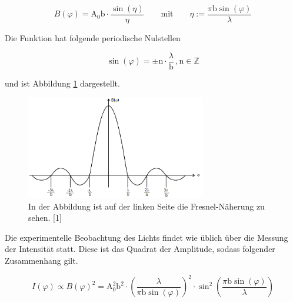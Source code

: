 \documentclass[titlepage = firstcover]{scrartcl}
\begin{document}
            \begin{equation}
                B(\varphi) = \text{A}_0 \text{b} \cdot \frac{\sin(\eta)}{\eta} \qquad \text{mit} \qquad \eta := \frac{\pi \text{b} \sin (\varphi)}{\lambda}
                \label{eqn:Winkelabhängigkeit}
            \end{equation}

            \noindent
            Die Funktion hat folgende periodische Nulstellen
            
            \begin{equation}
                \sin(\varphi) = \pm \text{n} \cdot \frac{\lambda}{\text{b}} \, , \text{n} \in \mathds{Z}
                \label{eqn:NSTEinzel}
            \end{equation}

            \noindent
            und ist Abbildung \ref{fig:BEinzel} dargestellt.

            \FloatBarrier

            \begin{figure}[h]
              \centering
              \includegraphics[width = 0.7\textwidth]{Bilder/BEinzel.png}
              \caption{In der Abbildung ist auf der linken Seite die Fresnel-Näherung zu sehen. [1]}
              \label{fig:BEinzel}
            \end{figure}

            \FloatBarrier

            \noindent

            Die experimentelle Beobachtung des Lichts findet wie üblich über die Messung der Intensität statt. Diese ist das Quadrat der Amplitude, sodass folgender Zusammenhang gilt.

            \begin{equation}
                I(\varphi) \propto B(\varphi)^2 = \text{A}_0^2 \text{b}^2 \cdot \left(\frac{\lambda}{\pi \text{b} \sin(\varphi)}\right)^2 \cdot \sin^2 \left(\frac{\pi \text{b} \sin(\varphi)}{\lambda}\right)
                \label{eqn:IEinzel}
            \end{equation}
\end{document}
